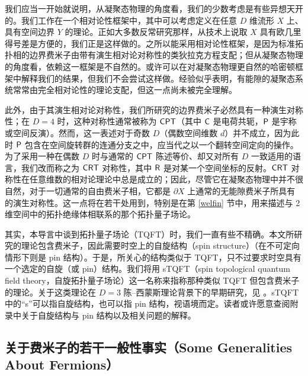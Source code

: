 我们应当一开始就说明，从凝聚态物理的角度看，我们的少数考虑是有些异想天开的。我们工作在一个相对论性框架中，其中可以考虑定义在任意 $D$ 维流形 $X$ 上、具有空间边界 $Y$ 的理论。正如大多数反常研究那样，从技术上说取 $X$ 具有欧几里得号差是方便的，我们正是这样做的。之所以能采用相对论性框架，是因为标准拓扑相的边界费米子由带有演生相对论对称性的类狄拉克方程支配；但从凝聚态物理的角度看，依赖这一框架是不自然的。或许可以在对凝聚态物理更自然的哈密顿框架中解释我们的结果，但我们不会尝试这样做。经验似乎表明，有能隙的凝聚态系统常常由完全相对论性的理论支配，但这一点尚未被完全理解。

此外，由于其演生相对论对称性，我们所研究的边界费米子必然具有一种演生对称性；在 $D=4$ 时，这种对称性通常被称为 ${\sf{CPT}}$（其中 ${\sf{C}}$ 是电荷共轭，${\sf P}$ 是宇称或空间反演）。然而，这一表述对于奇数 $D$（偶数空间维数 $d$）并不成立，因为此时 ${\sf P}$ 包含在空间旋转群的连通分支之中，应当代之以一个翻转空间定向的操作。为了采用一种在偶数 $D$ 时与通常的 ${\sf{CPT}}$ 陈述等价、却又对所有 $D$ 一致适用的语言，我们改而称之为 ${\sf{CRT}}$ 对称性，其中 ${\sf R}$ 是对某一个空间坐标的反射。${\sf{CRT}}$ 对称性在任意维数的相对论理论中总是成立的；因此，尽管它在凝聚态物理中并不很自然，对于一切通常的自由费米子相，它都是 $\partial X$ 上通常的无能隙费米子所具有的演生对称性。这一点将在若干处用到，特别是在第 \ref{welfin} 节中，用来描述与 2 维空间中的拓扑绝缘体相联系的那个拓扑量子场论。

其实，本导言中谈到拓扑量子场论（TQFT）时，我们一直有些不精确。本文所研究的理论包含费米子，因此需要时空上的自旋结构（spin structure）（在不可定向情形下则是 pin 结构）。于是，所关心的结构类似于 TQFT，只不过要求时空具有一个选定的自旋（或 pin）结构。我们将用 sTQFT（spin topological quantum field theory，自旋拓扑量子场论）这一名称来指称那种类似 TQFT 但包含费米子的理论。关于这类理论在 $D=3$ 陈--西蒙斯理论背景下的早期研究，见 \cite{DW}。sTQFT 中的“s”可以指自旋结构，也可以指 pin 结构，视语境而定。读者或许愿意查阅附录中关于自旋结构与 pin 结构以及相关问题的解释。

\subsection{关于费米子的若干一般性事实（Some Generalities About Fermions）}\label{generalities}

